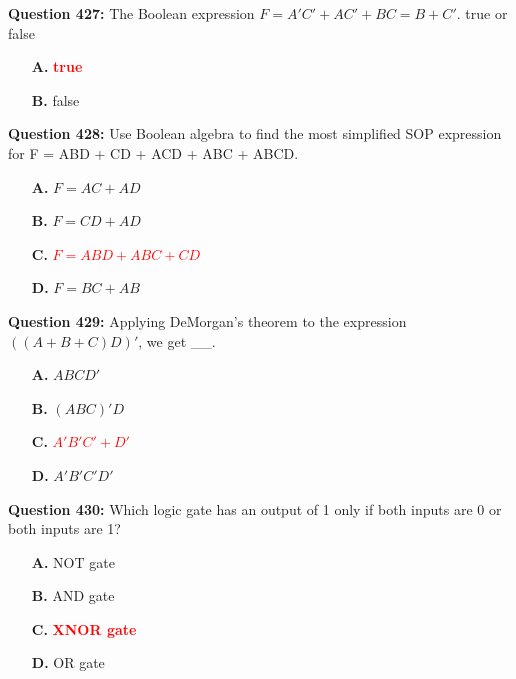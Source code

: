 \documentclass[12pt,a4paper]{article}
\begin{document}
\vspace{0.5cm}

\textbf{Question 427:} The Boolean expression $F = A'C' + AC' + BC = B + C'$. true or false

\begin{itemize}
    \item[\textbf{A.}] \textcolor{red}{\textbf{true}}
    \item[\textbf{B.}] false
\end{itemize}

\vspace{0.5cm}

\textbf{Question 428:} Use Boolean algebra to find the most simplified SOP expression for F = ABD + CD + ACD + ABC + ABCD.

\begin{itemize}
    \item[\textbf{A.}] $F = AC + AD$
    \item[\textbf{B.}] $F = CD + AD$
    \item[\textbf{C.}] \textcolor{red}{\textbf{$F = ABD + ABC + CD$}}
    \item[\textbf{D.}] $F = BC + AB$
\end{itemize}

\vspace{0.5cm}

\textbf{Question 429:} Applying DeMorgan's theorem to the expression $((A + B + C)D)'$, we get __.

\begin{itemize}
    \item[\textbf{A.}] $ABCD'$
    \item[\textbf{B.}] $(ABC)'D$
    \item[\textbf{C.}] \textcolor{red}{\textbf{$A'B'C' + D'$}}
    \item[\textbf{D.}] $A'B'C'D'$
\end{itemize}

\vspace{0.5cm}

\textbf{Question 430:} Which logic gate has an output of 1 only if both inputs are 0 or both inputs are 1?

\begin{itemize}
    \item[\textbf{A.}] NOT gate
    \item[\textbf{B.}] AND gate
    \item[\textbf{C.}] \textcolor{red}{\textbf{XNOR gate}}
    \item[\textbf{D.}] OR gate
\end{itemize}
\end{document}

